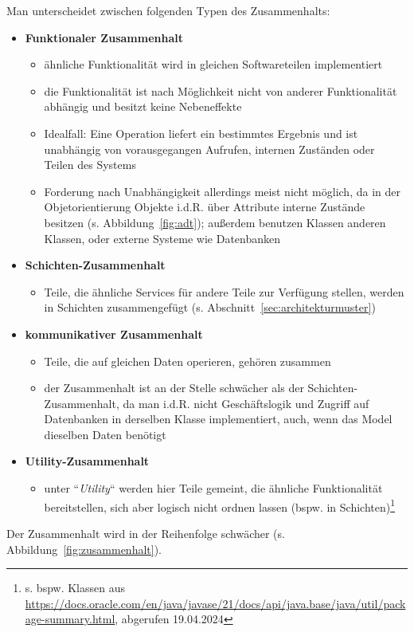 Man unterscheidet zwischen folgenden Typen des Zusammenhalts:

\begin{itemize}
    \item \textbf{Funktionaler Zusammenhalt}
    \begin{itemize}
        \item ähnliche Funktionalität wird in gleichen Softwareteilen implementiert
        \item die Funktionalität ist nach Möglichkeit nicht von anderer Funktionalität abhängig und besitzt keine Nebeneffekte
        \item Idealfall: Eine Operation liefert ein bestimmtes Ergebnis und ist unabhängig von vorausgegangen Aufrufen, internen Zuständen oder Teilen des Systems
        \item Forderung nach Unabhängigkeit allerdings meist nicht möglich, da in der Objetorientierung Objekte i.d.R. über Attribute interne Zustände besitzen (s. Abbildung~\ref{fig:adt}); außerdem benutzen Klassen anderen Klassen, oder externe Systeme wie Datenbanken
    \end{itemize}

    \item \textbf{Schichten-Zusammenhalt}
        \begin{itemize}
            \item Teile, die ähnliche Services für andere Teile zur Verfügung stellen, werden in Schichten zusammengefügt (s. Abschnitt~\ref{sec:architekturmuster})
        \end{itemize}
    \item \textbf{kommunikativer Zusammenhalt}
        \begin{itemize}
            \item Teile, die auf gleichen Daten operieren, gehören zusammen
            \item der Zusammenhalt ist an der Stelle schwächer als der Schichten-Zusammenhalt, da man i.d.R. nicht Geschäftslogik und Zugriff auf Datenbanken in derselben Klasse implementiert, auch, wenn das Model dieselben Daten benötigt
        \end{itemize}
    \item \textbf{Utility-Zusammenhalt}
        \begin{itemize}
            \item unter ``\textit{Utility}`` werden hier Teile gemeint, die ähnliche Funktionalität bereitstellen, sich aber logisch nicht ordnen lassen (bspw. in Schichten)\footnote{s. bspw. Klassen aus \url{https://docs.oracle.com/en/java/javase/21/docs/api/java.base/java/util/package-summary.html}, abgerufen 19.04.2024}
        \end{itemize}
\end{itemize}
\noindent
Der Zusammenhalt wird in der Reihenfolge schwächer (s. Abbildung~\ref{fig:zusammenhalt}).


